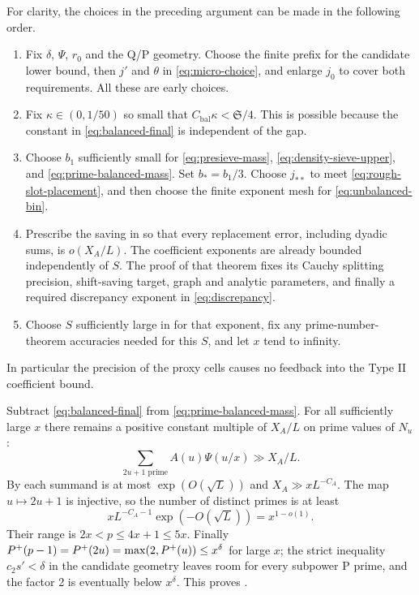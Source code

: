For clarity, the choices in the preceding argument can be made
in the following order.
\begin{enumerate}
\item Fix $\delta$, $\Psi$, $r_0$ and the Q/P geometry. Choose the
      finite prefix for the candidate lower bound, then $j'$ and
      $\theta$ in \eqref{eq:micro-choice}, and enlarge $j_0$ to
      cover both requirements. All these are early choices.
\item Fix $\kappa\in(0,1/50)$ so small that
      $C_{\mathrm{bal}}\kappa<\mathfrak S/4$. This is possible
      because the constant in \eqref{eq:balanced-final} is
      independent of the gap.
\item Choose $b_1$ sufficiently small for
      \eqref{eq:presieve-mass}, \eqref{eq:density-sieve-upper},
      and \eqref{eq:prime-balanced-mass}. Set $b_*=b_1/3$.
      Choose $j_{**}$ to meet \eqref{eq:rough-slot-placement},
      and then choose the finite exponent mesh for
      \eqref{eq:unbalanced-bin}.
\item Prescribe the saving in  so that every
      replacement error, including dyadic sums, is $o(X_A/L)$.
      The coefficient exponents are already bounded independently
      of $S$. The proof of that theorem fixes its Cauchy splitting
      precision, shift-saving target, graph and analytic
      parameters, and finally a required discrepancy exponent
      in \eqref{eq:discrepancy}.
\item Choose $S$ sufficiently large in
       for that exponent, fix any
      prime-number-theorem accuracies needed for this $S$, and
      let $x$ tend to infinity.
\end{enumerate}
In particular the precision of the proxy cells causes no
feedback into the Type II coefficient bound.

Subtract \eqref{eq:balanced-final} from
\eqref{eq:prime-balanced-mass}. For all sufficiently large $x$
there remains a positive constant multiple of $X_A/L$ on prime
values of $N_u$:
\[
 \sum_{2u+1\text{ prime}}A(u)\Psi(u/x)\gg X_A/L.
\]
By  each summand is at most
$\exp(O(\sqrt L))$ and $X_A\gg xL^{-C_A}$. The map
$u\mapsto2u+1$ is injective, so the number of distinct primes is
at least
\[
 xL^{-C_A-1}\exp(-O(\sqrt L))=x^{1-o(1)}.
\]
Their range is $2x<p\le4x+1\le5x$. Finally
$P^{+}(p-1)=P^{+}(2u)=\max(2,P^{+}(u))\le x^\delta$ for
large $x$; the strict inequality $c_2s'<\delta$ in the candidate
geometry leaves room for every subpower P prime, and the factor
2 is eventually below $x^\delta$. This proves
.
